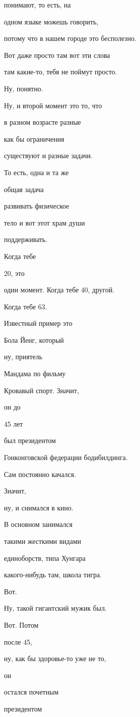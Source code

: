 понимают, то есть, на

одном языке можешь говорить,

потому что в нашем городе это бесполезно.

Вот даже просто там вот эти слова

там какие-то, тебя не поймут просто.

Ну, понятно.

Ну, и второй момент это то, что

в разном возрасте разные

как бы ограничения

существуют и разные задачи.

То есть, одна и та же

общая задача

развивать физическое

тело и вот этот храм души

поддерживать.

Когда тебе

20, это

один момент. Когда тебе 40, другой.

Когда тебе 63.

Известный пример это

Бола Йенг, который

ну, приятель

Мандама по фильму

Кровавый спорт. Значит,

он до

45 лет

был президентом

Гонконговской федерации бодибилдинга.

Сам постоянно качался.

Значит,

ну, и снимался в кино.

В основном занимался

такими жесткими видами

единоборств, типа Хунгара

какого-нибудь там, школа тигра.

Вот.

Ну, такой гигантский мужик был.

Вот. Потом

после 45,

ну, как бы здоровье-то уже не то,

он

остался почетным

президентом

